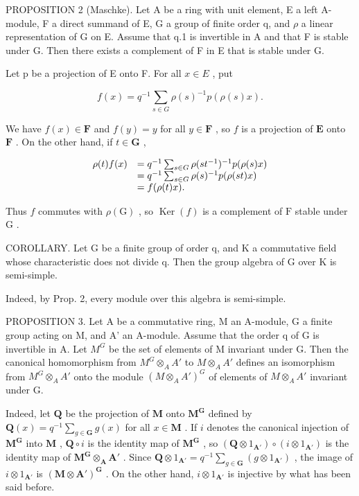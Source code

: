 PROPOSITION 2 (Maschke). Let A be a ring with unit element, E a left A-module, F a direct summand of E, G a group of finite order q, and \(\rho\) a linear representation of G on E. Assume that q.1 is invertible in A and that F is stable under G. Then there exists a complement of F in E that is stable under G.

Let p be a projection of E onto F. For all \(x \in E\) , put

\[
f (x) = q ^ {- 1} \sum_ {s \in G} \rho (s) ^ {- 1} p (\rho (s) x).
\]

We have \(f(x) \in \mathbf{F}\) and \(f(y) = y\) for all \(y \in \mathbf{F}\) , so \(f\) is a projection of \(\mathbf{E}\) onto \(\mathbf{F}\) . On the other hand, if \(t \in \mathbf{G}\) ,

\[
\begin{array}{r l} \rho (t) f (x) & = q ^ {- 1} \sum_ {s \in G} \rho (s t ^ {- 1}) ^ {- 1} p (\rho (s) x) \\ & = q ^ {- 1} \sum_ {s \in G} \rho (s) ^ {- 1} p (\rho (s t) x) \\ & = f (\rho (t) x). \end{array}
\]

Thus \(f\) commutes with \(\rho(\mathrm{G})\) , so \(\operatorname{Ker}(f)\) is a complement of \(\mathrm{F}\) stable under \(\mathrm{G}\) .

COROLLARY. Let G be a finite group of order q, and K a commutative field whose characteristic does not divide q. Then the group algebra of G over K is semi-simple.

Indeed, by Prop. 2, every module over this algebra is semi-simple.

PROPOSITION 3. Let A be a commutative ring, M an A-module, G a finite group acting on M, and A' an A-module. Assume that the order q of G is invertible in A. Let \(M^{G}\) be the set of elements of M invariant under G. Then the canonical homomorphism from \(M^{G} \otimes_{A} A'\) to \(M \otimes_{A} A'\) defines an isomorphism from \(M^{G} \otimes_{A} A'\) onto the module \((M \otimes_{A} A')^{G}\) of elements of \(M \otimes_{A} A'\) invariant under G.

Indeed, let \(\mathbf{Q}\) be the projection of \(\mathbf{M}\) onto \(\mathbf{M}^{\mathbf{G}}\) defined by \(\mathbf{Q}(x) = q^{-1}\sum_{g\in \mathbf{G}}g(x)\) for all \(x\in \mathbf{M}\) . If \(i\) denotes the canonical injection of \(\mathbf{M}^{\mathbf{G}}\) into \(\mathbf{M}\) , \(\mathbf{Q}\circ i\) is the identity map of \(\mathbf{M}^{\mathbf{G}}\) , so \((\mathbf{Q}\otimes 1_{\mathbf{A}'})\circ (i\otimes 1_{\mathbf{A}'})\) is the identity map of \(\mathbf{M}^{\mathbf{G}}\otimes_{\mathbf{A}}\mathbf{A}'\) . Since \(\mathbf{Q}\otimes 1_{\mathbf{A}'} = q^{-1}\sum_{g\in \mathbf{G}}(g\otimes 1_{\mathbf{A}'})\) , the image of \(i\otimes 1_{\mathbf{A}'}\) is \((\mathbf{M}\otimes \mathbf{A}')^{\mathbf{G}}\) . On the other hand, \(i\otimes 1_{\mathbf{A}'}\) is injective by what has been said before.

